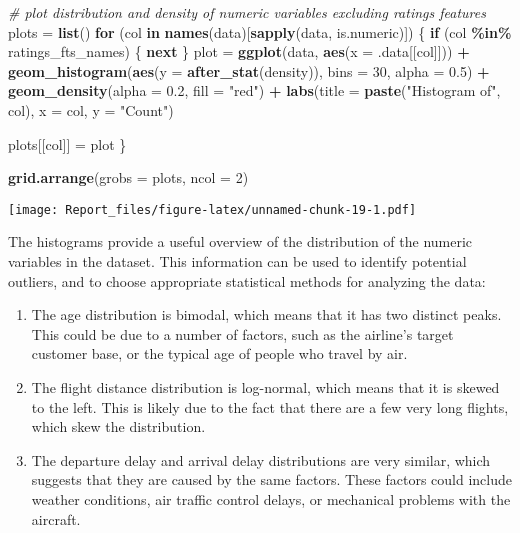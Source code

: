 \documentclass[
]{article}
\newenvironment{Shaded}{\begin{snugshade}}{\end{snugshade}}
\newcommand{\AttributeTok}[1]{\textcolor[rgb]{0.13,0.29,0.53}{#1}}
\newcommand{\CommentTok}[1]{\textcolor[rgb]{0.56,0.35,0.01}{\textit{#1}}}
\newcommand{\ControlFlowTok}[1]{\textcolor[rgb]{0.13,0.29,0.53}{\textbf{#1}}}
\newcommand{\DecValTok}[1]{\textcolor[rgb]{0.00,0.00,0.81}{#1}}
\newcommand{\FloatTok}[1]{\textcolor[rgb]{0.00,0.00,0.81}{#1}}
\newcommand{\FunctionTok}[1]{\textcolor[rgb]{0.13,0.29,0.53}{\textbf{#1}}}
\newcommand{\NormalTok}[1]{#1}
\newcommand{\OtherTok}[1]{\textcolor[rgb]{0.56,0.35,0.01}{#1}}
\newcommand{\SpecialCharTok}[1]{\textcolor[rgb]{0.81,0.36,0.00}{\textbf{#1}}}
\newcommand{\StringTok}[1]{\textcolor[rgb]{0.31,0.60,0.02}{#1}}
\begin{document}
\begin{Shaded}
\begin{Highlighting}[]
\CommentTok{\# plot distribution and density of numeric variables excluding ratings features}
\NormalTok{plots }\OtherTok{=} \FunctionTok{list}\NormalTok{()}
\ControlFlowTok{for}\NormalTok{ (col }\ControlFlowTok{in} \FunctionTok{names}\NormalTok{(data)[}\FunctionTok{sapply}\NormalTok{(data, is.numeric)]) \{}
  \ControlFlowTok{if}\NormalTok{ (col }\SpecialCharTok{\%in\%}\NormalTok{ ratings\_fts\_names) \{}
    \ControlFlowTok{next}
\NormalTok{  \}}
\NormalTok{  plot }\OtherTok{=} \FunctionTok{ggplot}\NormalTok{(data, }\FunctionTok{aes}\NormalTok{(}\AttributeTok{x =}\NormalTok{ .data[[col]])) }\SpecialCharTok{+}
  \FunctionTok{geom\_histogram}\NormalTok{(}\FunctionTok{aes}\NormalTok{(}\AttributeTok{y =} \FunctionTok{after\_stat}\NormalTok{(density)), }\AttributeTok{bins =} \DecValTok{30}\NormalTok{, }\AttributeTok{alpha =} \FloatTok{0.5}\NormalTok{) }\SpecialCharTok{+}
  \FunctionTok{geom\_density}\NormalTok{(}\AttributeTok{alpha =} \FloatTok{0.2}\NormalTok{, }\AttributeTok{fill =} \StringTok{"red"}\NormalTok{) }\SpecialCharTok{+}
  \FunctionTok{labs}\NormalTok{(}\AttributeTok{title =} \FunctionTok{paste}\NormalTok{(}\StringTok{"Histogram of"}\NormalTok{, col), }\AttributeTok{x =}\NormalTok{ col, }\AttributeTok{y =} \StringTok{"Count"}\NormalTok{) }

\NormalTok{  plots[[col]] }\OtherTok{=}\NormalTok{ plot}
\NormalTok{\}}

\FunctionTok{grid.arrange}\NormalTok{(}\AttributeTok{grobs =}\NormalTok{ plots, }\AttributeTok{ncol =} \DecValTok{2}\NormalTok{)}
\end{Highlighting}
\end{Shaded}

\texttt{[image: Report\_files/figure-latex/unnamed-chunk-19-1.pdf]}

The histograms provide a useful overview of the distribution of the
numeric variables in the dataset. This information can be used to
identify potential outliers, and to choose appropriate statistical
methods for analyzing the data:

\begin{enumerate}
\def\labelenumi{\arabic{enumi}.}
\item
  The age distribution is bimodal, which means that it has two distinct
  peaks. This could be due to a number of factors, such as the airline's
  target customer base, or the typical age of people who travel by air.
\item
  The flight distance distribution is log-normal, which means that it is
  skewed to the left. This is likely due to the fact that there are a
  few very long flights, which skew the distribution.
\item
  The departure delay and arrival delay distributions are very similar,
  which suggests that they are caused by the same factors. These factors
  could include weather conditions, air traffic control delays, or
  mechanical problems with the aircraft.
\end{enumerate}
\end{document}
